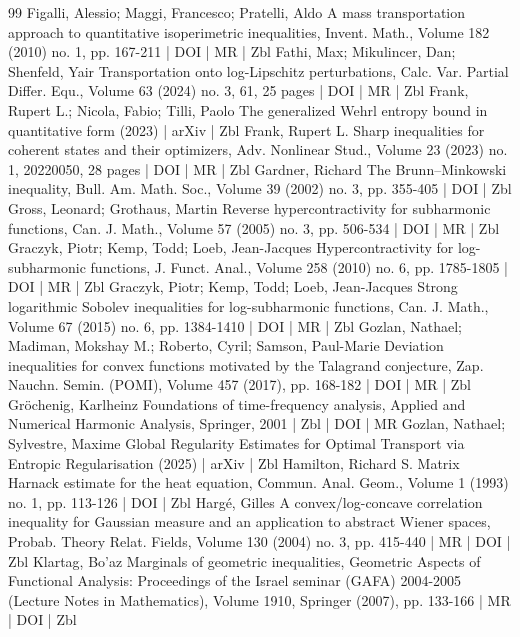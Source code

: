 \documentclass[10pt]{amsart}
\theoremstyle{definition}\newtheorem{defi}[theo]{Definition}\newtheorem{rema}[theo]{Remark}\newtheorem{exam}[theo]{Example}\newtheorem{exem}[theo]{Example}\newtheorem{nota}[theo]{Notation}
\begin{document}
\begin{thebibliography}{99}
 Figalli, Alessio; Maggi, Francesco; Pratelli, Aldo A mass transportation approach to quantitative isoperimetric inequalities, Invent. Math., Volume 182 (2010) no. 1, pp. 167-211 | DOI | MR | Zbl
 Fathi, Max; Mikulincer, Dan; Shenfeld, Yair Transportation onto log-Lipschitz perturbations, Calc. Var. Partial Differ. Equ., Volume 63 (2024) no. 3, 61, 25 pages | DOI | MR | Zbl
 Frank, Rupert L.; Nicola, Fabio; Tilli, Paolo The generalized Wehrl entropy bound in quantitative form (2023) | arXiv | Zbl
 Frank, Rupert L. Sharp inequalities for coherent states and their optimizers, Adv. Nonlinear Stud., Volume 23 (2023) no. 1, 20220050, 28 pages | DOI | MR | Zbl
 Gardner, Richard The Brunn–Minkowski inequality, Bull. Am. Math. Soc., Volume 39 (2002) no. 3, pp. 355-405 | DOI | Zbl
 Gross, Leonard; Grothaus, Martin Reverse hypercontractivity for subharmonic functions, Can. J. Math., Volume 57 (2005) no. 3, pp. 506-534 | DOI | MR | Zbl
 Graczyk, Piotr; Kemp, Todd; Loeb, Jean-Jacques Hypercontractivity for log-subharmonic functions, J. Funct. Anal., Volume 258 (2010) no. 6, pp. 1785-1805 | DOI | MR | Zbl
 Graczyk, Piotr; Kemp, Todd; Loeb, Jean-Jacques Strong logarithmic Sobolev inequalities for log-subharmonic functions, Can. J. Math., Volume 67 (2015) no. 6, pp. 1384-1410 | DOI | MR | Zbl
 Gozlan, Nathael; Madiman, Mokshay M.; Roberto, Cyril; Samson, Paul-Marie Deviation inequalities for convex functions motivated by the Talagrand conjecture, Zap. Nauchn. Semin. (POMI), Volume 457 (2017), pp. 168-182 | DOI | MR | Zbl
 Gröchenig, Karlheinz Foundations of time-frequency analysis, Applied and Numerical Harmonic Analysis, Springer, 2001 | Zbl | DOI | MR
 Gozlan, Nathael; Sylvestre, Maxime Global Regularity Estimates for Optimal Transport via Entropic Regularisation (2025) | arXiv | Zbl
 Hamilton, Richard S. Matrix Harnack estimate for the heat equation, Commun. Anal. Geom., Volume 1 (1993) no. 1, pp. 113-126 | DOI | Zbl
 Hargé, Gilles A convex/log-concave correlation inequality for Gaussian measure and an application to abstract Wiener spaces, Probab. Theory Relat. Fields, Volume 130 (2004) no. 3, pp. 415-440 | MR | DOI | Zbl
 Klartag, Bo’az Marginals of geometric inequalities, Geometric Aspects of Functional Analysis: Proceedings of the Israel seminar (GAFA) 2004-2005 (Lecture Notes in Mathematics), Volume 1910, Springer (2007), pp. 133-166 | MR | DOI | Zbl

\end{thebibliography}
\end{document}
